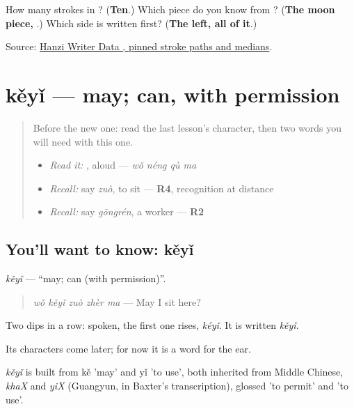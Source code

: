 \begin{tcolorbox}[breakable,colback=teal!4,colframe=teal!35!black,title={Before you move on}]
How many strokes in ? (\textbf{Ten}.) Which piece do you know from ? (\textbf{The moon piece, }.) Which side is written first? (\textbf{The left, all of it}.)

Source: \href{https://raw.githubusercontent.com/chanind/hanzi-writer-data/68d10a4b21150cae5e1ebbd223eed289cf32d90c/data/\%E8\%83\%BD.json}{Hanzi Writer Data , pinned stroke paths and medians}.
\end{tcolorbox}
\section[kěyǐ]{kěyǐ — may; can, with permission}

\label{lesson:ZH-C90-keyi}



\begin{quote}
Before the new one: read the last lesson's character, then two words you will need with this one.

\begin{itemize}
\raggedright
  \item \emph{Read it:} , aloud — \emph{wǒ néng qù ma}
  \item \emph{Recall:} say \emph{zuò}, to sit — \textbf{R4}, recognition at distance
  \item \emph{Recall:} say \emph{gōngrén}, a worker — \textbf{R2}
\end{itemize}
\end{quote}

\subsection*{You'll want to know: kěyǐ}
\emph{kěyǐ} — \textquotedblleft{}may; can (with permission)\textquotedblright{}.

\begin{quote}
\emph{wǒ kěyǐ zuò zhèr ma} — May I sit here?
\end{quote}

Two dips in a row: spoken, the first one rises, \emph{kéyǐ}. It is written \emph{kěyǐ}.

Its characters come later; for now it is a word for the ear.

\begin{cousinweb}
\emph{kěyǐ} is built from kě 'may' and yǐ 'to use', both inherited from Middle Chinese, \emph{khaX} and \emph{yiX} (Guangyun, in Baxter's transcription), glossed 'to permit' and 'to use'.
\end{cousinweb}

